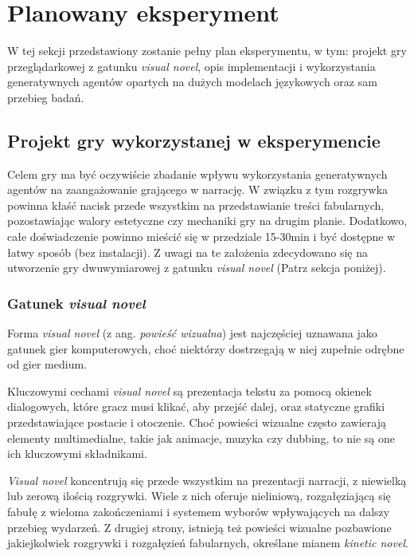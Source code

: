 \graphicspath{{chapters/chapter4/imgs/}}

\chapter{Planowany eksperyment}\label{chapter:ch4}

W tej sekcji przedstawiony zostanie pełny plan eksperymentu, w tym: projekt gry przeglądarkowej
z gatunku \textit{visual novel}, opis implementacji i wykorzystania generatywnych agentów
opartych na dużych modelach językowych oraz sam przebieg badań.

\section{Projekt gry wykorzystanej w eksperymencie}\label{section:ch4_1}

Celem gry ma być oczywiście zbadanie wpływu wykorzystania generatywnych agentów na zaangażowanie
grającego w narrację. W związku z tym rozgrywka powinna kłaść nacisk przede wszystkim na 
przedstawianie treści fabularnych, pozostawiając walory estetyczne czy mechaniki gry na drugim
planie. Dodatkowo, całe doświadczenie powinno mieścić się w przedziale 15-30min i być dostępne
w łatwy sposób (bez instalacji). Z uwagi na te założenia zdecydowano się na utworzenie gry
dwuwymiarowej z gatunku \textit{visual novel} (Patrz sekcja poniżej).

\subsection*{Gatunek \textit{visual novel}}\label{subsection:ch4_1_1}

Forma \textit{visual novel} (z ang. \textit{powieść wizualna}) jest najczęściej uznawana jako
gatunek gier komputerowych, choć niektórzy dostrzegają w niej zupełnie odrębne od gier 
medium\cite{tvtropes_visual_novel}. 

Kluczowymi cechami \textit{visual novel} są prezentacja tekstu za pomocą okienek dialogowych, które gracz 
musi klikać, aby przejść dalej, oraz statyczne grafiki przedstawiające postacie i otoczenie. Choć 
powieści wizualne często zawierają elementy multimedialne, takie jak animacje, muzyka czy dubbing, 
to nie są one ich kluczowymi składnikami\cite{tvtropes_visual_novel}.

\textit{Visual novel} koncentrują się przede wszystkim na prezentacji narracji, z niewielką lub zerową 
ilością rozgrywki. Wiele z nich oferuje nieliniową, rozgałęziającą się fabułę z wieloma 
zakończeniami i systemem wyborów wpływających na dalszy przebieg wydarzeń\cite{tvtropes_visual_novel}. 
Z drugiej strony, istnieją też powieści wizualne
pozbawione jakiejkolwiek rozgrywki i rozgałęzień fabularnych, określane mianem 
\textit{kinetic novel}\cite{tvtropes_kinetic_novel}.

